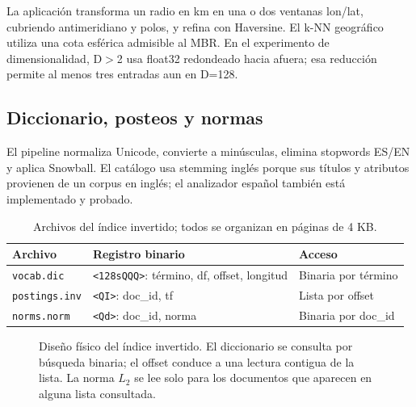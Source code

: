 \documentclass[11pt,a4paper]{article}
\newcommand{\code}[1]{\texttt{#1}}
\begin{document}
La aplicación transforma un radio en km en una o dos ventanas lon/lat, cubriendo antimeridiano y polos, y refina con Haversine. El k-NN geográfico utiliza una cota esférica admisible al MBR. En el experimento de dimensionalidad, D$>$2 usa float32 redondeado hacia afuera; esa reducción permite al menos tres entradas aun en D=128.

\subsection{Diccionario, posteos y normas}
El pipeline normaliza Unicode, convierte a minúsculas, elimina stopwords ES/EN y aplica Snowball. El catálogo usa stemming inglés porque sus títulos y atributos provienen de un corpus en inglés; el analizador español también está implementado y probado.

\begin{table}[H]\centering\small
\begin{tabular}{@{}lll@{}}\toprule
Archivo & Registro binario & Acceso\\\midrule
\code{vocab.dic} & \code{<128sQQQ>}: término, df, offset, longitud & Binaria por término\\
\code{postings.inv} & \code{<QI>}: doc\_id, tf & Lista por offset\\
\code{norms.norm} & \code{<Qd>}: doc\_id, norma & Binaria por doc\_id\\\bottomrule
\end{tabular}\caption{Archivos del índice invertido; todos se organizan en páginas de 4 KB.}
\end{table}


\begin{figure}[H]\centering
{}
\caption{Diseño físico del índice invertido. El diccionario se consulta por búsqueda binaria; el offset conduce a una lectura contigua de la lista. La norma $L_2$ se lee solo para los documentos que aparecen en alguna lista consultada.}\label{fig:inv}
\end{figure}
\end{document}
